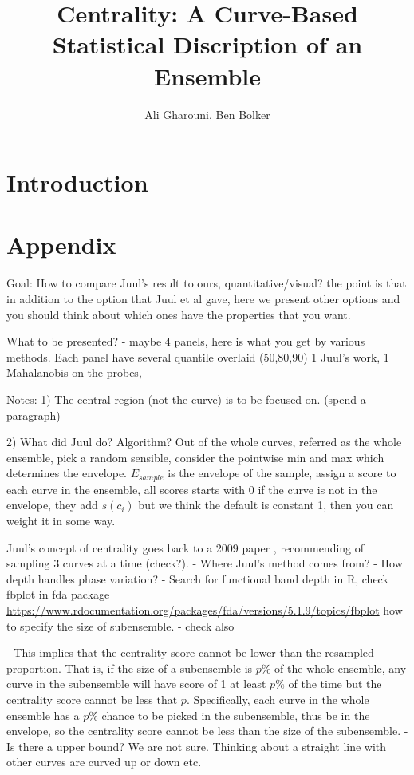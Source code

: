 \documentclass[12pt]{article}
\title{Centrality: A Curve-Based Statistical Discription of an Ensemble}
\author{Ali Gharouni, Ben Bolker}
\theoremstyle{definition} %
\begin{document}
\maketitle
\linenumbers

\section{Introduction}




\section{Appendix}


Goal: 
 How to compare Juul's result to ours, quantitative/visual? the point is that in addition to the option that Juul et al gave, here we present other options and you should think about which ones have the properties that you want.
 
What to be presented? 
- maybe 4 panels, here is what you get by various methods. Each panel have several quantile overlaid (50,80,90) 1 Juul's work, 1 Mahalanobis on the probes,  

Notes:
1) The central region (not the curve) is to be focused on. (spend a paragraph) 

2) What did Juul do? Algorithm? 
Out of the whole curves, referred as the whole ensemble, pick a random sensible, consider the pointwise min and max which determines the envelope. $E_{sample}$ is the envelope of the sample, assign a score to each curve in the ensemble, all scores starts with 0 if the curve is not in the envelope, they add $s(c_i)$ but we think the default is constant 1, then you can weight it in some way. 

Juul's concept of centrality goes back to a 2009 paper \cite{lopez2009concept}, recommending of sampling 3 curves at a time (check?). 
- Where Juul's method comes from?
- How depth handles phase variation?
- Search for functional band depth in R, check fbplot in fda package \url{https://www.rdocumentation.org/packages/fda/versions/5.1.9/topics/fbplot} how to specify the size of subensemble.
- check also \cite{sun2012exact}

- This implies that the centrality score cannot be lower than the resampled proportion. 
That is, if the size of a subensemble is $p\%$ of the whole ensemble, any curve in the subensemble will have score of 1 at least $p\%$ of the time but the centrality score cannot be less that $p$. Specifically, each curve in the whole ensemble has a $p\%$ chance to be picked in the subensemble, thus be in the envelope, so the centrality score cannot be less than the size of the subensemble.     
- Is there a upper bound? We are not sure. Thinking about a straight line with other curves are curved up or down etc.
\end{document}
